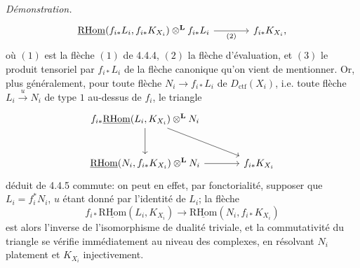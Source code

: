 \documentclass[11pt]{article}
\newenvironment{prooftext}[1][Proof]{\par\noindent\emph{#1.}\ }{\par\medskip}
\newcommand{\R}{\mathrm{R}}\newcommand{\RHomCore}{\mathrm{RHom}}
\providecommand{\RHom}{\RHomCore}
\providecommand{\uRHom}{\underline{\RHom}}
\providecommand{\Dctf}{D_{\mathrm{ctf}}}
\providecommand{\Dctf}{D_{\mathrm{ctf}}}
\providecommand{\RHom}{\RHomCore}
\providecommand{\RHom}{\R\mathcal{H}om}
\providecommand{\R}{\mathrm R}
\providecommand{\RHom}{\RHomCore}
\begin{document}
\begin{prooftext}[Démonstration]
\begin{equation}
\begin{tikzcd}[column sep=large,row sep=large]
\uRHom(f_{i*}L_i,f_{i*}K_{X_i})\otimes^{\mathbf L} f_{i*}L_i
 \arrow[r,"(2)"'] &
f_{i*}K_{X_i},
\end{tikzcd}
\end{equation}
où $(1)$ est la flèche $(1)$ de 4.4.4, $(2)$ la flèche d'évaluation, et $(3)$ le produit tensoriel par $f_{i*}L_i$ de la flèche canonique qu'on vient de mentionner. Or, plus généralement, pour toute flèche $N_i\longrightarrow f_{i*}L_i$ de $\Dctf(X_i)$, i.e. toute flèche $L_i\xrightarrow{u}N_i$ de type $1$ au-dessus de $f_i$, le triangle
\[
\begin{tikzcd}[column sep=large,row sep=large]
f_{i*}\uRHom(L_i,K_{X_i})\otimes^{\mathbf L}N_i
 \arrow[dr] \arrow[d] & \\
\uRHom(N_i,f_{i*}K_{X_i})\otimes^{\mathbf L}N_i \arrow[r] &
f_{i*}K_{X_i}
\end{tikzcd}
\]
déduit de 4.4.5 commute: on peut en effet, par fonctorialité, supposer que $L_i=f_i^*N_i$, $u$ étant donné par l'identité de $L_i$; la flèche
\[
f_{i*}\uRHom(L_i,K_{X_i})\longrightarrow\uRHom(N_i,f_{i*}K_{X_i})
\]
est alors l'inverse de l'isomorphisme de dualité triviale, et la commutativité du triangle se vérifie immédiatement au niveau des complexes, en résolvant $N_i$ platement et $K_{X_i}$ injectivement.


\end{prooftext}
\end{document}
